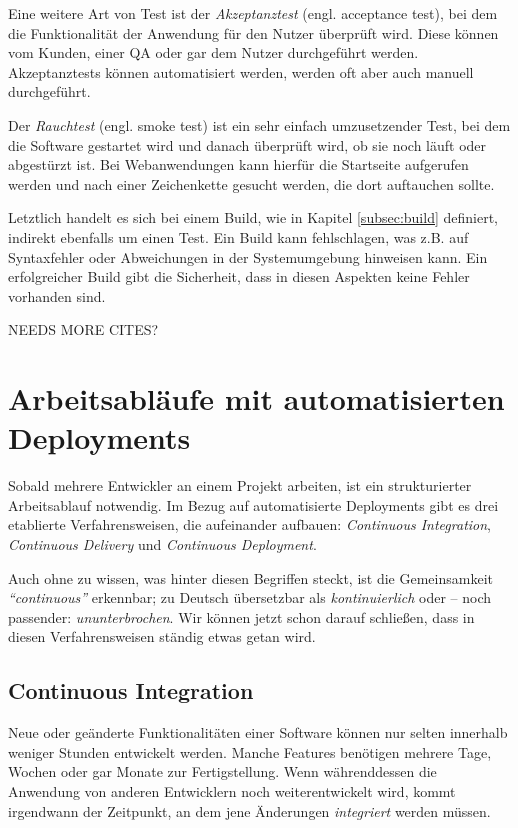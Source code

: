 Eine weitere Art von Test ist der \emph{Akzeptanztest} (engl. acceptance test), bei dem die Funktionalität der Anwendung für den Nutzer überprüft wird. Diese können vom Kunden, einer \ac{QA} oder gar dem Nutzer durchgeführt werden. Akzeptanztests können automatisiert werden, werden oft aber auch manuell durchgeführt.

Der \emph{Rauchtest} (engl. smoke test) ist ein sehr einfach umzusetzender Test, bei dem die Software gestartet wird und danach überprüft wird, ob sie noch läuft oder abgestürzt ist. Bei Webanwendungen kann hierfür die Startseite aufgerufen werden und nach einer Zeichenkette gesucht werden, die dort auftauchen sollte.

Letztlich handelt es sich bei einem Build, wie in Kapitel \ref{subsec:build} definiert, indirekt ebenfalls um einen Test. Ein Build kann fehlschlagen, was z.B. auf Syntaxfehler oder Abweichungen in der Systemumgebung hinweisen kann. Ein erfolgreicher Build gibt die Sicherheit, dass in diesen Aspekten keine Fehler vorhanden sind.

{\draft NEEDS MORE CITES?}

\section{Arbeitsabläufe mit automatisierten Deployments}

Sobald mehrere Entwickler an einem Projekt arbeiten, ist ein strukturierter Arbeitsablauf notwendig. Im Bezug auf automatisierte Deployments gibt es drei etablierte Verfahrensweisen, die aufeinander aufbauen: \emph{Continuous Integration}, \emph{Continuous Delivery} und \emph{Continuous Deployment}.

Auch ohne zu wissen, was hinter diesen Begriffen steckt, ist die Gemeinsamkeit \emph{``continuous''} erkennbar; zu Deutsch übersetzbar als \emph{kontinuierlich} oder – noch passender: \emph{ununterbrochen}. Wir können jetzt schon darauf schließen, dass in diesen Verfahrensweisen ständig etwas getan wird.

\subsection{Continuous Integration}

Neue oder geänderte Funktionalitäten einer Software können nur selten innerhalb weniger Stunden entwickelt werden. Manche Features benötigen mehrere Tage, Wochen oder gar Monate zur Fertigstellung. Wenn während\-dessen die Anwendung von anderen Entwicklern noch weiterentwickelt wird, kommt irgendwann der Zeitpunkt, an dem jene Änderungen \emph{integriert} werden müssen.

